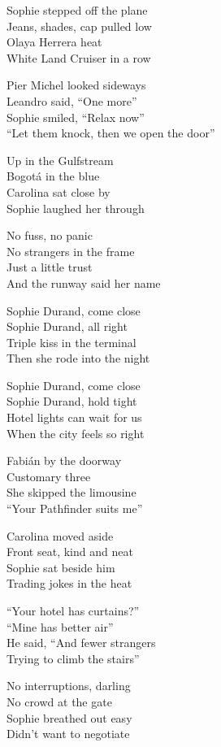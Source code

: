 \begin{lyrics}
Sophie stepped off the plane\\
Jeans, shades, cap pulled low\\
Olaya Herrera heat\\
White Land Cruiser in a row

Pier Michel looked sideways\\
Leandro said, “One more”\\
Sophie smiled, “Relax now”\\
“Let them knock, then we open the door”

Up in the Gulfstream\\
Bogotá in the blue\\
Carolina sat close by\\
Sophie laughed her through

No fuss, no panic\\
No strangers in the frame\\
Just a little trust\\
And the runway said her name

Sophie Durand, come close\\
Sophie Durand, all right\\
Triple kiss in the terminal\\
Then she rode into the night

Sophie Durand, come close\\
Sophie Durand, hold tight\\
Hotel lights can wait for us\\
When the city feels so right

Fabián by the doorway\\
Customary three\\
She skipped the limousine\\
“Your Pathfinder suits me”

Carolina moved aside\\
Front seat, kind and neat\\
Sophie sat beside him\\
Trading jokes in the heat

“Your hotel has curtains?”\\
“Mine has better air”\\
He said, “And fewer strangers\\
Trying to climb the stairs”

No interruptions, darling\\
No crowd at the gate\\
Sophie breathed out easy\\
Didn’t want to negotiate


\end{lyrics}

